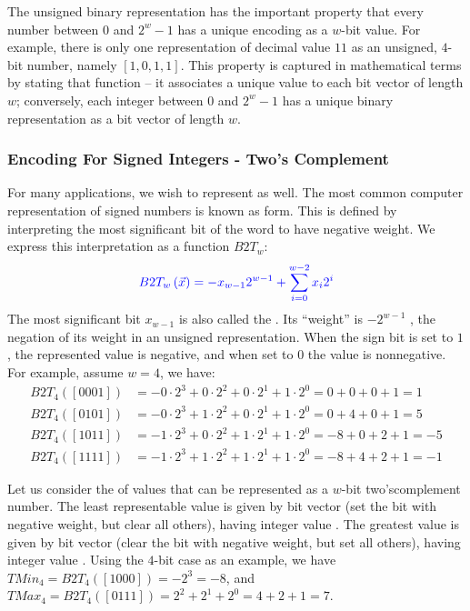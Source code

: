 The unsigned binary representation has the important property that every number between $0$ and $2^w - 1$ has a unique encoding as a $w$-bit value. For example, there is only one representation of decimal value $11$ as an unsigned, $4$-bit number, namely $[1, 0, 1, 1]$. This property is captured in mathematical terms by stating that function {\color{blue}{$B2U_w$ is a bijection}} -- it associates a unique value to each bit vector of length $w$; conversely, each integer between $0$ and $2^w - 1$ has a unique binary representation as a bit vector of length $w$.

\subsubsection{Encoding For Signed Integers - Two's Complement}
For many applications, we wish to represent {\color{blue}{negative values}} as well. The most common computer representation of signed numbers is known as {\color{blue}{two’s-complement}} form. This is defined by interpreting the most significant bit of the word to have negative weight. We express this interpretation as a function $B2T_w$:
\begin{equation}
{\color{blue}{B2T_w\left(\vec{x}\right) = -x_{w-1}2^{w-1} + \sum_{i=0}^{w-2}x_i2^i}}
\end{equation}
The most significant bit $x_{w-1}$ is also called the {\color{blue}{sign bit}}. Its “weight” is $-2^{w-1}$ , the negation of its weight in an unsigned representation. When the sign bit is set to $1$, the represented value is negative, and when set to $0$ the value is nonnegative.\\

For example, assume $w = 4$, we have:
\begin{align*}
B2T_4([0001]) &= -0 \cdot 2^3 + 0 \cdot 2^2 + 0 \cdot 2^1 + 1 \cdot 2^0 = 0 + 0 + 0 + 1 = 1 \\
B2T_4([0101]) &= -0 \cdot 2^3 + 1 \cdot 2^2 + 0 \cdot 2^1 + 1 \cdot 2^0 = 0 + 4 + 0 + 1 = 5 \\
B2T_4([1011]) &= -1 \cdot 2^3 + 0 \cdot 2^2 + 1 \cdot 2^1 + 1 \cdot 2^0 = -8 + 0 + 2 + 1 = -5 \\
B2T_4([1111]) &= -1 \cdot 2^3 + 1 \cdot 2^2 + 1 \cdot 2^1 + 1 \cdot 2^0 = -8 + 4 + 2 + 1 = -1
\end{align*}\mbox{}

Let us consider the {\color{blue}{range}} of values that can be represented as a $w$-bit two’scomplement number. The least representable value is given by bit vector {\color{blue}{$[1, 0, \dots, 0]$}} (set the bit with negative weight, but clear all others), having integer value {}. The greatest value is given by bit vector {\color{blue}{$[0, 1, \dots, 1] $}} (clear the bit with negative weight, but set all others), having integer value {}. Using the $4$-bit case as an example, we have $TMin_4 = B2T_4 ([1000]) = -2^3 = -8$, and $TMax_4 = B2T_4 ([0111]) = 2^2 + 2^1 + 2^0 = 4 + 2 + 1 = 7$.\\

